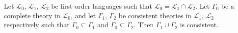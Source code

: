Let $\mathcal{L}_0$, $\mathcal{L}_1$, $\mathcal{L}_2$ be first-order languages such that $\mathcal{L}_0 = \mathcal{L}_1 \cap \mathcal{L}_2$. Let $\Gamma_0$ be a complete theory in $\mathcal{L}_0$, and let $\Gamma_1$, $\Gamma_2$ be consistent theories in $\mathcal{L}_1$, $\mathcal{L}_2$ respectively such that $\Gamma_0 \subseteq \Gamma_1$ and $\Gamma_0 \subseteq \Gamma_2$. Then $\Gamma_1 \cup \Gamma_2$ is consistent.
